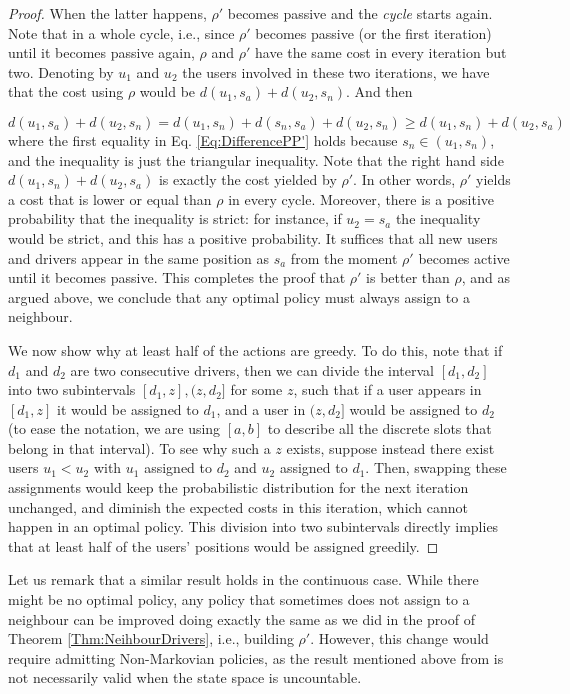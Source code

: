 \documentclass[12pt,english]{article}
\begin{document}
{\begin{proof}
When the latter happens, $\rho'$ becomes passive and the \textit{cycle} starts again. Note that in a whole cycle, i.e., since $\rho'$ becomes passive (or the first iteration) until it becomes passive again, $\rho$ and $\rho'$ have the same cost in every iteration but two. Denoting by $u_1$ and $u_2$ the users involved in these two iterations, we have that the cost using $\rho$ would be $d(u_1,s_a) + d(u_2,s_n)$. And then

\begin{equation}\label{Eq:DifferencePP'}
    d(u_1,s_a) + d(u_2,s_n) = d(u_1,s_n) + d(s_n,s_a) + d(u_2,s_n) \geq d(u_1,s_n) + d(u_2,s_a)
\end{equation}
where the first equality in Eq. \eqref{Eq:DifferencePP'} holds because $s_n \in (u_1,s_n)$, and the inequality is just the triangular inequality. Note that the right hand side $d(u_1,s_n) + d(u_2,s_a)$ is exactly the cost yielded by $\rho'$. In other words, $\rho'$ yields a cost that is lower or equal than $\rho$ in every cycle. Moreover, there is a positive probability that the inequality is strict: for instance, if $u_2=s_a$ the inequality would be strict, and this has a positive probability. It suffices that all new users and drivers appear in the same position as $s_a$ from the moment $\rho'$ becomes active until it becomes passive. This completes the proof that $\rho'$ is better than $\rho$, and as argued above, we conclude that any optimal policy must always assign to a neighbour.

We now show why at least half of the actions are greedy. To do this, note that if $d_1$ and $d_2$ are two consecutive drivers, then we can divide the interval $[d_1,d_2]$ into two subintervals $[d_1,z],(z,d_2]$ for some $z$, such that if a user appears in $[d_1,z]$ it would be assigned to $d_1$, and a user in $(z,d_2]$ would be assigned to $d_2$ (to ease the notation, we are using $[a,b]$ to describe all the discrete slots that belong in that interval). To see why such a $z$ exists, suppose instead there exist users $u_1 < u_2$ with $u_1$ assigned to $d_2$ and $u_2$ assigned to $d_1$. Then, swapping these assignments would keep the probabilistic distribution for the next iteration unchanged, and diminish the expected costs in this iteration, which cannot happen in an optimal policy. This division into two subintervals directly implies that at least half of the users' positions would be assigned greedily.
\end{proof}

Let us remark that a similar result holds in the continuous case. While there might be no optimal policy, any policy that sometimes does not assign to a neighbour can be improved doing exactly the same as we did in the proof of Theorem \ref{Thm:NeihbourDrivers}, i.e., building $\rho'$. However, this change would require admitting Non-Markovian policies, as the result mentioned above from \cite{puterman2014markov} is not necessarily valid when the state space is uncountable.

}
\end{document}
